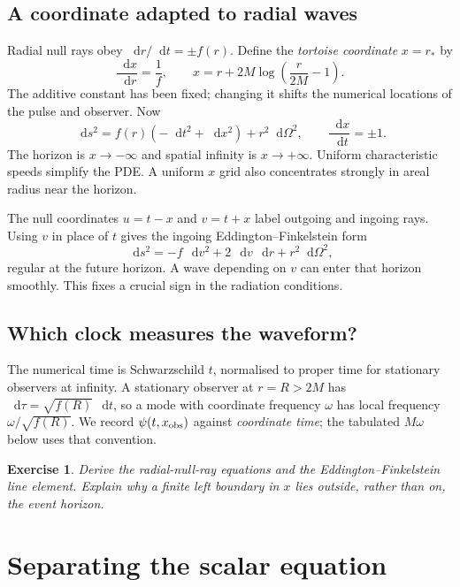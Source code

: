 \documentclass[11pt,a4paper]{article}
\numberwithin{equation}{section}
\newtheorem{exercise}{Exercise}[section]
\newcommand{\dd}{\mathop{}\!\mathrm{d}}
\begin{document}
\subsection{A coordinate adapted to radial waves}
Radial null rays obey $\dd r/\dd t=\pm f(r)$. Define the
\emph{tortoise coordinate} $x=r_*$ by
\begin{equation}\label{eq:tortoise}
 \frac{\dd x}{\dd r}=\frac1f,\qquad
 x=r+2M\log\left(\frac{r}{2M}-1\right).
\end{equation}
The additive constant has been fixed; changing it shifts the numerical
locations of the pulse and observer. Now
\begin{equation}
 \dd s^2=f(r)(-\dd t^2+\dd x^2)+r^2\dd\Omega^2,\qquad
 \frac{\dd x}{\dd t}=\pm1.
\end{equation}
The horizon is $x\to-\infty$ and spatial infinity is $x\to+\infty$.
Uniform characteristic speeds simplify the PDE. A uniform $x$ grid also
concentrates strongly in areal radius near the horizon.

The null coordinates $u=t-x$ and $v=t+x$ label outgoing and ingoing rays.
Using $v$ in place of $t$ gives the ingoing Eddington--Finkelstein form
\begin{equation}
 \dd s^2=-f\,\dd v^2+2\,\dd v\,\dd r+r^2\dd\Omega^2,
\end{equation}
regular at the future horizon. A wave depending on $v$ can enter that
horizon smoothly. This fixes a crucial sign in the radiation conditions.

\subsection{Which clock measures the waveform?}
The numerical time is Schwarzschild $t$, normalised to proper time for
stationary observers at infinity. A stationary observer at $r=R>2M$
has $\dd\tau=\sqrt{f(R)}\,\dd t$, so a mode with coordinate frequency $\omega$
has local frequency $\omega/\sqrt{f(R)}$. We record
$\psi(t,x_{\rm obs})$ against \emph{coordinate time}; the tabulated
$M\omega$ below uses that convention.

\begin{exercise}
Derive the radial-null-ray equations and the Eddington--Finkelstein line
element. Explain why a finite left boundary in $x$ lies outside, rather
than on, the event horizon.
\end{exercise}

\section{Separating the scalar equation}\label{sec:reduction}
\end{document}
